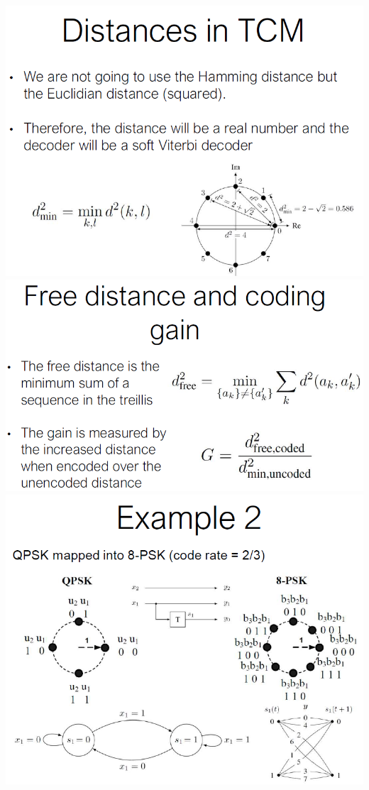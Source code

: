 \begin{multicols*}{4}
    \includegraphics[width=\columnwidth]{images/merde3.png}
    \includegraphics[width=\columnwidth]{images/merde4.png}
    \includegraphics[width=\columnwidth]{images/merde5.png}

\end{multicols*}
